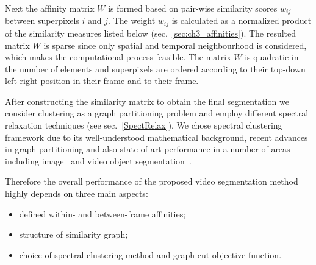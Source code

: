 Next the affinity matrix $W$ is formed based on pair-wise similarity scores $w_{ij}$ between superpixels $i$ and $j$. The weight $w_{ij}$ is calculated as a normalized product of the similarity measures listed below
(sec.~\ref{sec:ch3_affinities}). The resulted matrix $W$ is sparse since only spatial and temporal neighbourhood is considered, which makes the computational process feasible. The matrix $W$ is quadratic in the number of elements
and superpixels are ordered according to their top-down left-right position in their frame and to their frame.

After constructing the similarity matrix to obtain the final segmentation we consider clustering as a graph partitioning problem and employ different spectral relaxation techniques (see sec.~\ref{SpectRelax}).
We chose spectral clustering framework due to its well-understood mathematical background, recent advances in graph partitioning and also state-of-art performance in a number of areas including image~\cite{Shi00,Arbelaez11} 
and video object segmentation~\cite{Brox10,GalassoCS12,Galasso14}.  

Therefore the overall performance of the proposed video segmentation method highly depends on three main aspects:
\begin{itemize}
\item defined within- and between-frame affinities;
\item structure of similarity graph;
\item choice of spectral clustering method and graph cut objective function.
\end{itemize}

